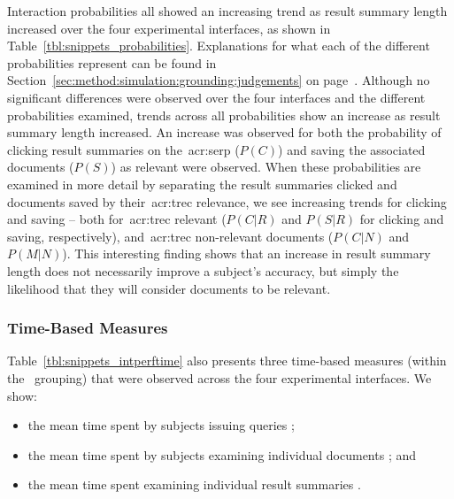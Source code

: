 Interaction probabilities all showed an increasing trend as result summary length increased over the four experimental interfaces, as shown in Table~\ref{tbl:snippets_probabilities}. Explanations for what each of the different probabilities represent can be found in Section~\ref{sec:method:simulation:grounding:judgements} on page~\pageref{sec:method:simulation:grounding:judgements}. Although no significant differences were observed over the four interfaces and the different probabilities examined, trends across all probabilities show an increase as result summary length increased. An increase was observed for both the probability of clicking result summaries on the~\gls{acr:serp} ($P(C)$) and saving the associated documents ($P(S)$) as relevant were observed. When these probabilities are examined in more detail by separating the result summaries clicked and documents saved by their~\gls{acr:trec} relevance, we see increasing trends for clicking and saving -- both for~\gls{acr:trec} relevant ($P(C|R)$ and $P(S|R)$ for clicking and saving, respectively), and~\gls{acr:trec} non-relevant documents ($P(C|N)$ and $P(M|N)$). This interesting finding shows that an increase in result summary length does not necessarily improve a subject's accuracy, but simply the likelihood that they will consider documents to be relevant.


\subsubsection{Time-Based Measures}\label{chap:snippets:user:results:time}
Table~\ref{tbl:snippets_intperftime} also presents three time-based measures (within the ~grouping) that were observed across the four experimental interfaces. We show:

\begin{itemize}
    \item{the mean time spent by subjects issuing queries ;}
    \item{the mean time spent by subjects examining individual documents ; and}
    \item{the mean time spent examining individual result summaries .}
\end{itemize}

